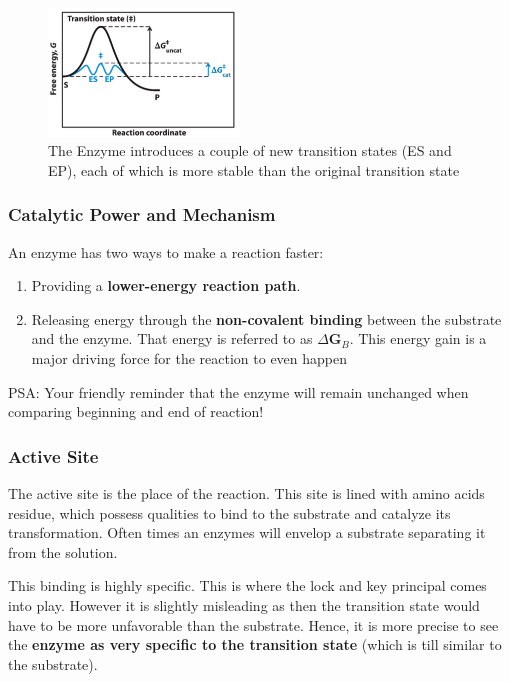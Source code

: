 \documentclass[../main.tex]{subfiles}
\begin{document}
\begin{figure}[h]
	\centering
	\includegraphics[width=0.45\textwidth]{Enzyme_RD}
	\caption{The Enzyme introduces a couple of new transition states (ES and EP), each of which is more stable than the original transition state}
\end{figure}

\subsubsection{\gls{Catalytic Power} and Mechanism}
An enzyme has two ways to make a reaction faster:
\begin{enumerate}
	\item Providing a \textbf{lower-energy reaction path}.
	\item Releasing energy through the \textbf{non-covalent binding} between the substrate and the enzyme. That energy is referred to as \textbf{$\Delta$G$_{B}$}. This energy gain is a major driving force for the reaction to even happen
\end{enumerate}

PSA: Your friendly reminder that the enzyme will remain unchanged when comparing beginning and end of reaction!

\subsubsection{\gls{Active Site}}

The active site is the place of the reaction. This site is lined with amino acids residue, which possess qualities to bind to the substrate and catalyze its transformation. Often times an enzymes will envelop a  substrate separating it from the solution.

This binding is highly specific. This is where the lock and key principal comes into play. However it is slightly misleading as then the transition state would have to be more unfavorable than the  substrate. Hence, it is more precise to see the \textbf{enzyme as very specific to the transition state} (which is till similar to the substrate).
\end{document}
